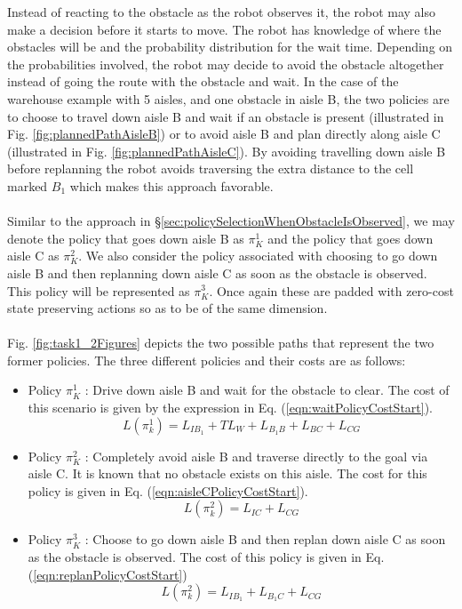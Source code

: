 \documentclass[a4paper,12pt]{article}
\begin{document}
			Instead of reacting to the obstacle as the robot observes it, the robot may also make a decision before it starts to move. The robot has knowledge of where the obstacles will be and the probability distribution for the wait time. Depending on the probabilities involved, the robot may decide to avoid the obstacle altogether instead of going the route with the obstacle and wait. In the case of the warehouse example with 5 aisles, and one obstacle in aisle B, the two policies are to choose to travel down aisle B and wait if an obstacle is present (illustrated in Fig. \ref{fig:plannedPathAisleB}) or to avoid aisle B and plan directly along aisle C (illustrated in Fig. \ref{fig:plannedPathAisleC}). By avoiding travelling down aisle B before replanning the robot avoids traversing the extra distance to the cell marked $B_1$ which makes this approach favorable.
			\\
			\\
			Similar to the approach in \S \ref{sec:policySelectionWhenObstacleIsObserved}, we may denote the policy that goes down aisle B as $\pi_{K}^{1}$ and the policy that goes down aisle C as $\pi_{K}^{2}$. We also consider the policy associated with choosing to go down aisle B and then replanning down aisle C as soon as the obstacle is observed. This policy will be represented as $\pi_{K}^{3}$. Once again these are padded with zero-cost state preserving actions so as to be of the same dimension. 
			\\
			\\
			Fig. \ref{fig:task1_2Figures} depicts the two possible paths that represent the two former policies. The three different policies and their costs are as follows:
			\begin{itemize}
				\item Policy $\pi_{K}^{1}$ : Drive down aisle B and wait for the obstacle to clear. The cost of this scenario is given by the expression in Eq. (\ref{eqn:waitPolicyCostStart}).
				\begin{equation}
				L(\pi_k^1) = L_{IB_1}+TL_W+L_{B_1B}+L_{BC}+L_{CG}
				\label{eqn:waitPolicyCostStart}
				\end{equation}
				\item Policy $\pi_{K}^{2}$ : Completely avoid aisle B and traverse directly to the goal via aisle C. It is known that no obstacle exists on this aisle. The cost for this policy is given in Eq. (\ref{eqn:aisleCPolicyCostStart}).
				\begin{equation}
				L(\pi_k^2) = L_{IC}+L_{CG}
				\label{eqn:aisleCPolicyCostStart}
				\end{equation}
				\item Policy $\pi_{K}^{3}$ : Choose to go down aisle B and then replan down aisle C as soon as the obstacle is observed. The cost of this policy is given in Eq. (\ref{eqn:replanPolicyCostStart})
				\begin{equation}
				L(\pi_k^2) = L_{IB_1}+L_{B_1C}+L_{CG}
				\label{eqn:replanPolicyCostStart}
				\end{equation}
			\end{itemize}
			
\end{document}
